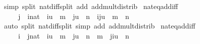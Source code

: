 \begin{isabellebody}
%
\isadelimproof
%
\endisadelimproof
%
\isatagproof
{}\isamarkupfalse%
\ {\isacharparenleft}{\kern0pt}simp\ split{\isacharcolon}{\kern0pt}\ nat{\isacharunderscore}{\kern0pt}diff{\isacharunderscore}{\kern0pt}split\ add{\isacharcolon}{\kern0pt}\ add{\isacharunderscore}{\kern0pt}mult{\isacharunderscore}{\kern0pt}distrib{\isacharparenright}{\kern0pt}%
\endisatagproof
{\isafoldproof}%
%
\isadelimproof
\isanewline
%
\endisadelimproof
\isanewline
{}\isamarkupfalse%
\ nat{\isacharunderscore}{\kern0pt}eq{\isacharunderscore}{\kern0pt}add{\isacharunderscore}{\kern0pt}iff{}{\isacharcolon}{\kern0pt}\isanewline
\ \ \ \ \ {\isachardoublequoteopen}j\ {\isacharless}{\kern0pt}{\isacharequal}{\kern0pt}\ {\isacharparenleft}{\kern0pt}i{\isacharcolon}{\kern0pt}{\isacharcolon}{\kern0pt}nat{\isacharparenright}{\kern0pt}\ {\isacharequal}{\kern0pt}{\isacharequal}{\kern0pt}{\isachargreater}{\kern0pt}\ {\isacharparenleft}{\kern0pt}i{\isacharasterisk}{\kern0pt}u\ {\isacharplus}{\kern0pt}\ m\ {\isacharequal}{\kern0pt}\ j{\isacharasterisk}{\kern0pt}u\ {\isacharplus}{\kern0pt}\ n{\isacharparenright}{\kern0pt}\ {\isacharequal}{\kern0pt}\ {\isacharparenleft}{\kern0pt}{\isacharparenleft}{\kern0pt}i{\isacharminus}{\kern0pt}j{\isacharparenright}{\kern0pt}{\isacharasterisk}{\kern0pt}u\ {\isacharplus}{\kern0pt}\ m\ {\isacharequal}{\kern0pt}\ n{\isacharparenright}{\kern0pt}{\isachardoublequoteclose}\isanewline
%
\isadelimproof
%
\endisadelimproof
%
\isatagproof
{}\isamarkupfalse%
\ {\isacharparenleft}{\kern0pt}auto\ split{\isacharcolon}{\kern0pt}\ nat{\isacharunderscore}{\kern0pt}diff{\isacharunderscore}{\kern0pt}split\ simp\ add{\isacharcolon}{\kern0pt}\ add{\isacharunderscore}{\kern0pt}mult{\isacharunderscore}{\kern0pt}distrib{\isacharparenright}{\kern0pt}%
\endisatagproof
{\isafoldproof}%
%
\isadelimproof
\isanewline
%
\endisadelimproof
\isanewline
{}\isamarkupfalse%
\ nat{\isacharunderscore}{\kern0pt}eq{\isacharunderscore}{\kern0pt}add{\isacharunderscore}{\kern0pt}iff{}{\isacharcolon}{\kern0pt}\isanewline
\ \ \ \ \ {\isachardoublequoteopen}i\ {\isacharless}{\kern0pt}{\isacharequal}{\kern0pt}\ {\isacharparenleft}{\kern0pt}j{\isacharcolon}{\kern0pt}{\isacharcolon}{\kern0pt}nat{\isacharparenright}{\kern0pt}\ {\isacharequal}{\kern0pt}{\isacharequal}{\kern0pt}{\isachargreater}{\kern0pt}\ {\isacharparenleft}{\kern0pt}i{\isacharasterisk}{\kern0pt}u\ {\isacharplus}{\kern0pt}\ m\ {\isacharequal}{\kern0pt}\ j{\isacharasterisk}{\kern0pt}u\ {\isacharplus}{\kern0pt}\ n{\isacharparenright}{\kern0pt}\ {\isacharequal}{\kern0pt}\ {\isacharparenleft}{\kern0pt}m\ {\isacharequal}{\kern0pt}\ {\isacharparenleft}{\kern0pt}j{\isacharminus}{\kern0pt}i{\isacharparenright}{\kern0pt}{\isacharasterisk}{\kern0pt}u\ {\isacharplus}{\kern0pt}\ n{\isacharparenright}{\kern0pt}{\isachardoublequoteclose}\isanewline

\end{isabellebody}

